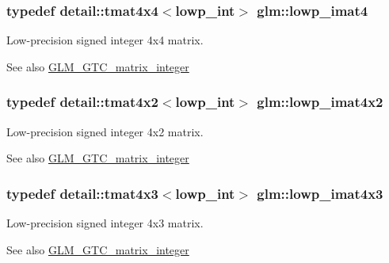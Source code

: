\subsubsection[{lowp\+\_\+imat4}]{\setlength{\rightskip}{0pt plus 5cm}typedef detail\+::tmat4x4$<$lowp\+\_\+int$>$ {\bf glm\+::lowp\+\_\+imat4}}\label{group__gtc__matrix__integer_ga644e005864dce94a642fcfe939538deb}
Low-\/precision signed integer 4x4 matrix. \begin{DoxySeeAlso}{See also}
\hyperlink{group__gtc__matrix__integer}{G\+L\+M\+\_\+\+G\+T\+C\+\_\+matrix\+\_\+integer} 
\end{DoxySeeAlso}
\hypertarget{group__gtc__matrix__integer_ga6b4261f0c13ebc56e2bc76bf7170830c}{}
\subsubsection[{lowp\+\_\+imat4x2}]{\setlength{\rightskip}{0pt plus 5cm}typedef detail\+::tmat4x2$<$lowp\+\_\+int$>$ {\bf glm\+::lowp\+\_\+imat4x2}}\label{group__gtc__matrix__integer_ga6b4261f0c13ebc56e2bc76bf7170830c}
Low-\/precision signed integer 4x2 matrix. \begin{DoxySeeAlso}{See also}
\hyperlink{group__gtc__matrix__integer}{G\+L\+M\+\_\+\+G\+T\+C\+\_\+matrix\+\_\+integer} 
\end{DoxySeeAlso}
\hypertarget{group__gtc__matrix__integer_gaae7774306f7549793307afb385738163}{}
\subsubsection[{lowp\+\_\+imat4x3}]{\setlength{\rightskip}{0pt plus 5cm}typedef detail\+::tmat4x3$<$lowp\+\_\+int$>$ {\bf glm\+::lowp\+\_\+imat4x3}}\label{group__gtc__matrix__integer_gaae7774306f7549793307afb385738163}
Low-\/precision signed integer 4x3 matrix. \begin{DoxySeeAlso}{See also}
\hyperlink{group__gtc__matrix__integer}{G\+L\+M\+\_\+\+G\+T\+C\+\_\+matrix\+\_\+integer} 
\end{DoxySeeAlso}
\hypertarget{group__gtc__matrix__integer_gaac17bd47c20d89a75d933f21e79e3411}{}
